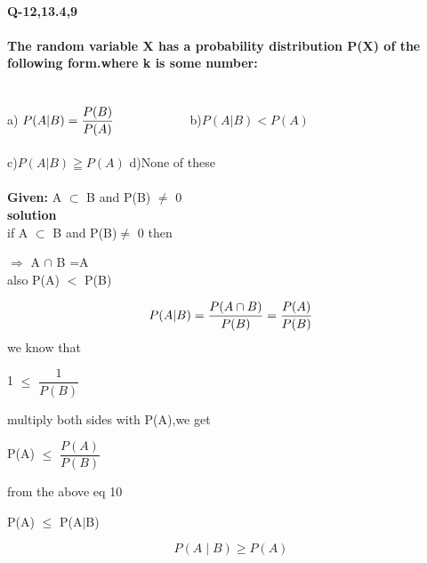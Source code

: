 \documentclass[10pt, a4paper]{article}
\title{\mytitle}
\author{\myauthor\hspace{1em} \\\contact\\FWC22094\hspace{6.5em}IITH\hspace{0.5em}\mymodule\hspace{6em}Module 2}
\date{}
\begin{document}
\maketitle
\paragraph*{\large Q-12,13.4,9}
\paragraph*{\large The random variable X has a probability distribution P(X) of the following form.where k is some number: }
\hspace{15mm}\\
a) $P(A|B) = \dfrac{P(B)}{P(A)}\hspace{20mm}$ b)$P(A|B) < P(A)$
\\
\\
c)$P(A|B) \geqq P(A)$ \hspace{21mm} d)None of these\\
\\
\noindent \textbf{Given:} A $\subset$ B and P(B) $\neq$ 0\\
\textbf{solution}\\
if A $\subset$ B and P(B)$\neq$ 0 then \\
\begin{center}
$\Rightarrow$ A $\cap$ B =A\\
also P(A) $<$ P(B)\\\vspace{2mm}
\end{center}
\begin{equation}
P(A|B) = \dfrac{P(A \cap B)}{P(B)}=\dfrac{P(A)}{P(B)}\\
\end{equation}
we know that \\
\begin{center}
1 $\leq$ $\dfrac{1}{P(B)}$
\end{center}
multiply both sides with P(A),we get
\begin{center}
P(A) $\leq$ $\dfrac{P(A)}{P(B)}$
\end{center}
from the above eq 10
\begin{center}
P(A) $\leq$ P(A$\mid$B)
\end{center}
\begin{equation}
\boxed{ P(A \mid B)\geq P(A)}
\end{equation}
\end{document}
